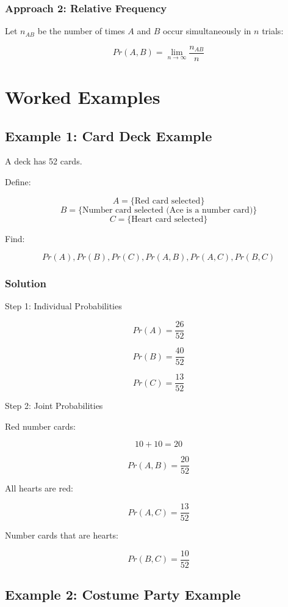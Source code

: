 \documentclass[12pt]{article}
\begin{document}
\subsubsection*{Approach 2: Relative Frequency}

Let $n_{AB}$ be the number of times $A$ and $B$ occur simultaneously in $n$ trials:

\[
Pr(A,B) = \lim_{n\to\infty} \frac{n_{AB}}{n}
\]

\section{Worked Examples}

\subsection{Example 1: Card Deck Example}

A deck has 52 cards.

Define:

\[
A = \{\text{Red card selected}\}
\]
\[
B = \{\text{Number card selected (Ace is a number card)}\}
\]
\[
C = \{\text{Heart card selected}\}
\]

Find:

\[
Pr(A), Pr(B), Pr(C), Pr(A,B), Pr(A,C), Pr(B,C)
\]

\subsubsection*{Solution}

Step 1: Individual Probabilities

\[
Pr(A) = \frac{26}{52}
\]

\[
Pr(B) = \frac{40}{52}
\]

\[
Pr(C) = \frac{13}{52}
\]

Step 2: Joint Probabilities

Red number cards:

\[
10 + 10 = 20
\]

\[
Pr(A,B) = \frac{20}{52}
\]

All hearts are red:

\[
Pr(A,C) = \frac{13}{52}
\]

Number cards that are hearts:

\[
Pr(B,C) = \frac{10}{52}
\]

\subsection{Example 2: Costume Party Example}
\end{document}
